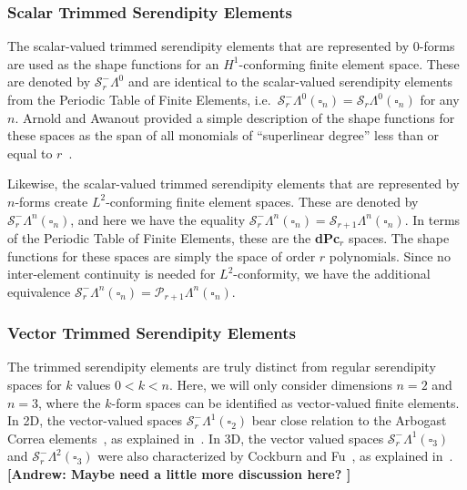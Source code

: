 \documentclass[format=acmsmall,screen,timestamp=false,a4paper]{acmart}
\newcommand\akg[1]{\textbf{\textcolor[rgb]{.5,0,1}{[Andrew: #1]}}}
\newcommand{\calP}{\mathcal{P}}
\newcommand{\calS}{\mathcal{S}}
\begin{document}
  
  \subsubsection{Scalar Trimmed Serendipity Elements}
  The scalar-valued trimmed serendipity elements that are represented by $0$-forms are used as the shape functions for an $H^1$-conforming finite element space.  These are denoted by $\calS_r^-\Lambda^0$ and are identical to the scalar-valued serendipity elements from the Periodic Table of Finite Elements, i.e.\ $\calS_r^-\Lambda^0(\square_n) = \calS_r\Lambda^0(\square_n)$ for any $n$.  Arnold and Awanout provided a simple description of the shape functions for these spaces as the span of all monomials of ``superlinear degree'' less than or equal to $r$~\cite{arnold2011serendipity}. 
  
  Likewise, the scalar-valued trimmed serendipity elements that are represented by $n$-forms create $L^2$-conforming finite element spaces.  These are denoted by $\calS_r^-\Lambda^n(\square_n)$, and here we have the equality $\calS_r^-\Lambda^n(\square_n) = \calS_{r+1}\Lambda^n(\square_n)$.  In terms of the Periodic Table of Finite Elements, these are the \textbf{dPc}$_r$ spaces.  The shape functions for these spaces are simply the space of order $r$ polynomials.  Since no inter-element continuity is needed for $L^2$-conformity, we have the additional equivalence $\calS_r^-\Lambda^n(\square_n) = \calP_{r+1}\Lambda^n(\square_n)$.
  
  \subsubsection{Vector Trimmed Serendipity Elements}
  

	The trimmed serendipity elements are truly distinct from regular serendipity spaces for $k$ values $0<k<n$.  Here, we will only consider dimensions $n=2$ and $n=3$, where the $k$-form spaces can be identified as vector-valued finite elements.  
	In 2D, the vector-valued spaces $\calS_r^-\Lambda^1(\square_2)$ bear close relation to the Arbogast Correa elements~\cite{arbogast2016two}, as explained in~\cite[Prop 2.2]{gillette2019trimmed}.
	In 3D, the vector valued spaces $\calS_r^-\Lambda^1(\square_3)$ and $\calS_r^-\Lambda^2(\square_3)$ were also characterized by Cockburn and Fu~\cite{CF2016}, as explained in~\cite[Prop 2.3]{gillette2019trimmed}.
	\akg{Maybe need a little more discussion here? }
	
\end{document}
